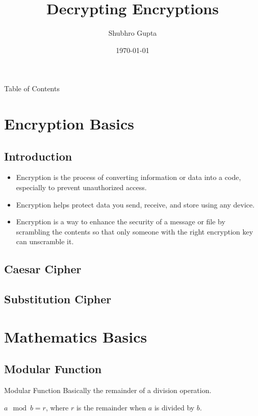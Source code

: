 \documentclass{beamer}
\title{Decrypting Encryptions}
\author{Shubhro Gupta}
\date{\today}
\begin{document}
\begin{frame}
	\titlepage
\end{frame}

\begin{frame}
	{Table of Contents}
	\tableofcontents
\end{frame}

\section{Encryption Basics}

\subsection{Introduction}
\begin{frame}
	\begin{itemize}
		\item Encryption is the process of converting information or data into a code, especially to prevent unauthorized access.
		\item Encryption helps protect data you send, receive, and store using any device.
		\item Encryption is a way to enhance the security of a message or file by scrambling the contents so that only someone with the right encryption key can unscramble it.
	\end{itemize}
\end{frame}

\subsection{Caesar Cipher}
\subsection{Substitution Cipher}


\section{Mathematics Basics}
\subsection{Modular Function}
\begin{frame}
	\begin{block}{Modular Function}
		Basically the remainder of a division operation.\\
	\end{block}
	$a \mod b = r$, where $r$ is the remainder when $a$ is divided by $b$.
\end{frame}
\end{document}
